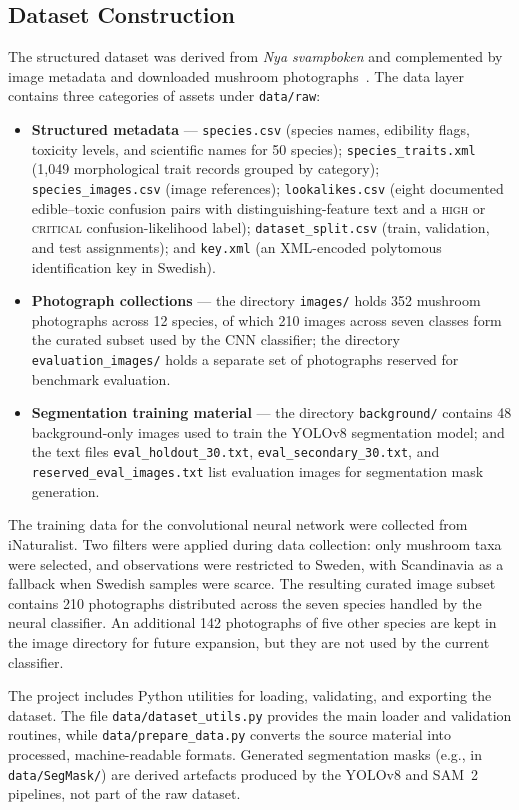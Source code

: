 \subsection{Dataset Construction}
\label{sec:method-data}

The structured dataset was derived from \emph{Nya svampboken} and complemented by image metadata and downloaded mushroom photographs~\cite{Nya_svampboken}. The data layer contains three categories of assets under \texttt{data/raw}:

\begin{itemize}
    \item \textbf{Structured metadata} --- \texttt{species.csv} (species names, edibility flags, toxicity levels, and scientific names for 50 species); \texttt{species\_traits.xml} (1,049 morphological trait records grouped by category); \texttt{species\_images.csv} (image references); \texttt{lookalikes.csv} (eight documented edible--toxic confusion pairs with distinguishing-feature text and a \textsc{high} or \textsc{critical} confusion-likelihood label); \texttt{dataset\_split.csv} (train, validation, and test assignments); and \texttt{key.xml} (an XML-encoded polytomous identification key in Swedish).
    
    \item \textbf{Photograph collections} --- the directory \texttt{images/} holds 352 mushroom photographs across 12 species, of which 210 images across seven classes form the curated subset used by the CNN classifier; the directory \texttt{evaluation\_images/} holds a separate set of photographs reserved for benchmark evaluation.
    
    \item \textbf{Segmentation training material} --- the directory \texttt{background/} contains 48 background-only images used to train the YOLOv8 segmentation model; and the text files \texttt{eval\_holdout\_30.txt}, \texttt{eval\_secondary\_30.txt}, and \texttt{reserved\_eval\_images.txt} list evaluation images for segmentation mask generation.
\end{itemize}

The training data for the convolutional neural network were collected from iNaturalist. Two filters were applied during data collection: only mushroom taxa were selected, and observations were restricted to Sweden, with Scandinavia as a fallback when Swedish samples were scarce. The resulting curated image subset contains 210 photographs distributed across the seven species handled by the neural classifier. An additional 142 photographs of five other species are kept in the image directory for future expansion, but they are not used by the current classifier.

The project includes Python utilities for loading, validating, and exporting the dataset. The file \texttt{data/dataset\_utils.py} provides the main loader and validation routines, while \texttt{data/prepare\_data.py} converts the source material into processed, machine-readable formats. Generated segmentation masks (e.g., in \texttt{data/SegMask/}) are derived artefacts produced by the YOLOv8 and SAM~2 pipelines, not part of the raw dataset.
